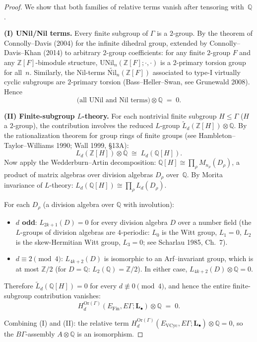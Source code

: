 \begin{proof}
We show that both families of relative terms vanish after tensoring with~$\mathbb Q$.

\medskip\noindent
\textbf{(I) UNil/Nil terms.}
Every finite subgroup of $\Gamma$ is a $2$-group.
By the theorem of Connolly--Davis (2004) for the infinite dihedral group,
extended by Connolly--Davis--Khan (2014) to arbitrary $2$-group coefficients:
for any finite $2$-group $F$ and any $\mathbb Z[F]$-bimodule structure,
$\mathrm{UNil}_n(\mathbb Z[F];\cdot,\cdot)$ is a $2$-primary torsion group for all~$n$.
Similarly, the Nil-terms $\widetilde{\mathrm{Nil}}_n(\mathbb Z[F])$ associated to
type-I virtually cyclic subgroups are $2$-primary torsion
(Bass--Heller--Swan, see Grunewald 2008).
Hence
\[
\text{(all UNil and Nil terms)}\otimes\mathbb Q\;=\;0.
\]

\medskip\noindent
\textbf{(II) Finite-subgroup $L$-theory.}
For each nontrivial finite subgroup $H\le\Gamma$ ($H$ a $2$-group),
the contribution involves the reduced $L$-group
$\widetilde L_d(\mathbb Z[H])\otimes\mathbb Q$.
By the rationalization theorem for group rings of finite groups
(see Hambleton--Taylor--Williams 1990; Wall 1999, \S13A):
\[
L_d(\mathbb Z[H])\otimes\mathbb Q
\;\cong\;
L_d(\mathbb Q[H]).
\]
Now apply the Wedderburn--Artin decomposition:
$\mathbb Q[H]\cong\prod_\rho M_{n_\rho}(D_\rho)$,
a product of matrix algebras over division algebras $D_\rho$ over~$\mathbb Q$.
By Morita invariance of $L$-theory:
$L_d(\mathbb Q[H])\cong\prod_\rho L_d(D_\rho)$.

For each $D_\rho$ (a division algebra over $\mathbb Q$ with involution):
\begin{itemize}
\item \textbf{$d$ odd}: $L_{2k+1}(D)=0$ for every division algebra $D$
  over a number field (the $L$-groups of division algebras are $4$-periodic:
  $L_0$ is the Witt group, $L_1=0$, $L_2$ is the skew-Hermitian Witt group,
  $L_3=0$; see Scharlau 1985, Ch.~7).
\item \textbf{$d\equiv 2\pmod{4}$}: $L_{4k+2}(D)$ is isomorphic to
  an Arf--invariant group, which is at most $\mathbb Z/2$
  (for $D=\mathbb Q$: $L_2(\mathbb Q)=\mathbb Z/2$).
  In either case, $L_{4k+2}(D)\otimes\mathbb Q=0$.
\end{itemize}
Therefore $\widetilde L_d(\mathbb Q[H])=0$ for every
$d\not\equiv 0\pmod{4}$, and hence the entire finite-subgroup
contribution vanishes:
\[
H_d^{\mathrm{Or}(\Gamma)}(E_{\mathrm{Fin}},E\Gamma;\mathbf L_\bullet)\otimes\mathbb Q
\;=\;0.
\]

\medskip\noindent
Combining (I) and (II): the relative term
$H_d^{\mathrm{Or}(\Gamma)}(E_{\mathrm{VCyc}},E\Gamma;\mathbf L_\bullet)\otimes\mathbb Q=0$,
so the $B\Gamma$-assembly $A\otimes\mathbb Q$ is an isomorphism.
\end{proof}


